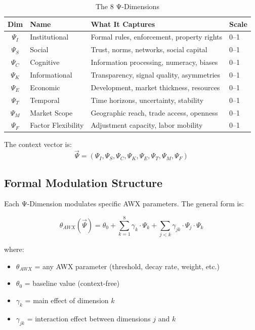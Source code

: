 \begin{table}[htbp]
\centering
\caption{The 8 Ψ-Dimensions}
\label{tab:psi-dimensions}
\renewcommand{\arraystretch}{1.3}
\begin{tabular}{@{}clll@{}}
\toprule
\textbf{Dim} & \textbf{Name} & \textbf{What It Captures} & \textbf{Scale} \\
\midrule
$\Psi_I$ & Institutional & Formal rules, enforcement, property rights & 0--1 \\
$\Psi_S$ & Social & Trust, norms, networks, social capital & 0--1 \\
$\Psi_C$ & Cognitive & Information processing, numeracy, biases & 0--1 \\
$\Psi_K$ & Informational & Transparency, signal quality, asymmetries & 0--1 \\
$\Psi_E$ & Economic & Development, market thickness, resources & 0--1 \\
$\Psi_T$ & Temporal & Time horizons, uncertainty, stability & 0--1 \\
$\Psi_M$ & Market Scope & Geographic reach, trade access, openness & 0--1 \\
$\Psi_F$ & Factor Flexibility & Adjustment capacity, labor mobility & 0--1 \\
\bottomrule
\end{tabular}
\end{table}

The context vector is:
\begin{equation}
\vec{\Psi} = (\Psi_I, \Psi_S, \Psi_C, \Psi_K, \Psi_E, \Psi_T, \Psi_M, \Psi_F)
\end{equation}

\subsection{Formal Modulation Structure}

Each Ψ-Dimension modulates specific AWX parameters. The general form is:

\begin{equation}
\theta_{AWX}(\vec{\Psi}) = \theta_0 + \sum_{k=1}^{8} \gamma_k \cdot \Psi_k + \sum_{j<k} \gamma_{jk} \cdot \Psi_j \cdot \Psi_k
\label{eq:psi-modulation}
\end{equation}

where:
\begin{itemize}
    \item $\theta_{AWX}$ = any AWX parameter (threshold, decay rate, weight, etc.)
    \item $\theta_0$ = baseline value (context-free)
    \item $\gamma_k$ = main effect of dimension $k$
    \item $\gamma_{jk}$ = interaction effect between dimensions $j$ and $k$
\end{itemize}

